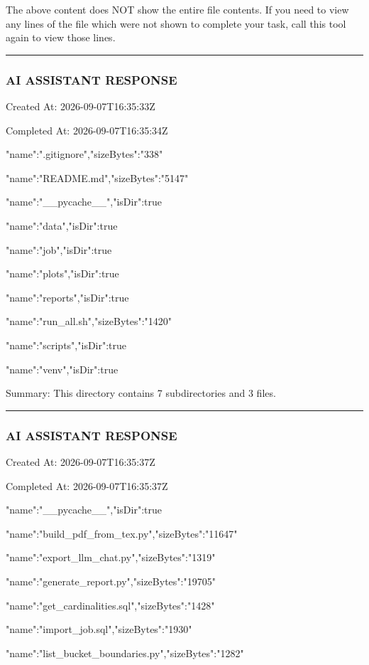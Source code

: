 \documentclass[11pt,a4paper]{article}
\begin{document}
The above content does NOT show the entire file contents. If you need to view any lines of the file which were not shown to complete your task, call this tool again to view those lines.


\hrule

\subsubsection{AI ASSISTANT RESPONSE}

Created At: 2026-09-07T16:35:33Z

Completed At: 2026-09-07T16:35:34Z

{"name":".gitignore","sizeBytes":"338"}

{"name":"README.md","sizeBytes":"5147"}

{"name":"\_\_pycache\_\_","isDir":true}

{"name":"data","isDir":true}

{"name":"job","isDir":true}

{"name":"plots","isDir":true}

{"name":"reports","isDir":true}

{"name":"run\_all.sh","sizeBytes":"1420"}

{"name":"scripts","isDir":true}

{"name":"venv","isDir":true}


Summary: This directory contains 7 subdirectories and 3 files.


\hrule

\subsubsection{AI ASSISTANT RESPONSE}

Created At: 2026-09-07T16:35:37Z

Completed At: 2026-09-07T16:35:37Z

{"name":"\_\_pycache\_\_","isDir":true}

{"name":"build\_pdf\_from\_tex.py","sizeBytes":"11647"}

{"name":"export\_llm\_chat.py","sizeBytes":"1319"}

{"name":"generate\_report.py","sizeBytes":"19705"}

{"name":"get\_cardinalities.sql","sizeBytes":"1428"}

{"name":"import\_job.sql","sizeBytes":"1930"}

{"name":"list\_bucket\_boundaries.py","sizeBytes":"1282"}
\end{document}
